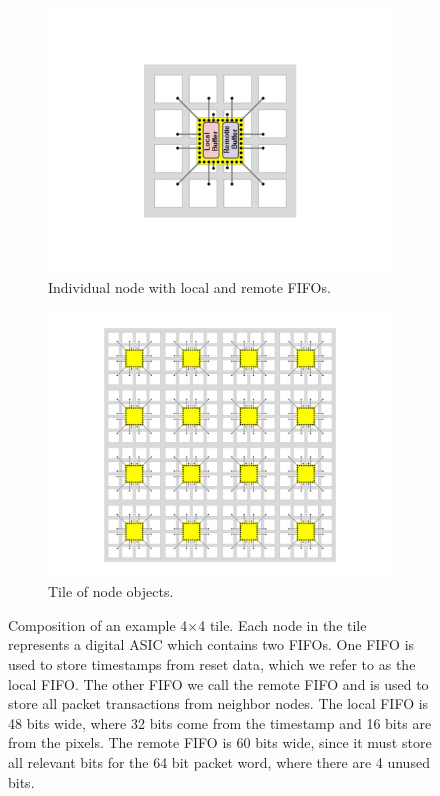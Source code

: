 \begin{figure}
\centering
\begin{subfigure}{.5\textwidth}
  \centering
  \includegraphics[width=\textwidth]{images/asic_FIFO_image.pdf}
  \caption{Individual node with local and remote FIFOs.}
\end{subfigure}%
\begin{subfigure}{.5\textwidth}
  \centering
  \includegraphics[width=\textwidth]{images/asic_tile_FIFO_image.pdf}
  \caption{Tile of node objects.}
\end{subfigure}
\caption{Composition of an example 4$\times$4 tile.
Each node in the tile represents a digital ASIC which contains two FIFOs.
One FIFO is used to store timestamps from reset data, which we refer to as the local FIFO.
The other FIFO we call the remote FIFO and is used to store all packet transactions from neighbor nodes.
The local FIFO is 48 bits wide, where 32 bits come from the timestamp and 16 bits are from the pixels.
The remote FIFO is 60 bits wide, since it must store all relevant bits for the 64 bit packet word, where there are 4 unused bits.
}
\label{fig:node_fifo_objects}
\end{figure}

